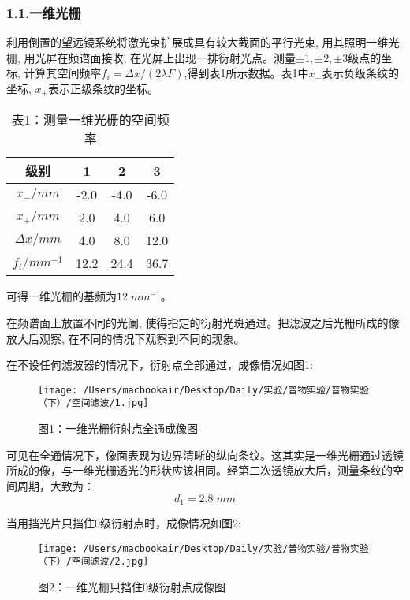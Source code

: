 \documentclass[23pt,a4paper,two column]{article}
\begin{document}
\subsubsection*{1.1.一维光栅}
利用倒置的望远镜系统将激光束扩展成具有较大截面的平行光束, 用其照明一维光栅, 用光屏在频谱面接收, 在光屏上出现一排衍射光点。测量$\pm1,\pm2,\pm3$级点的坐标, 计算其空间频率$f_i=\Delta x/(2\lambda F)$,得到表1所示数据。表1中$x_-$表示负级条纹的坐标, $x_+$表示正级条纹的坐标。
\begin{table}[H]
\centering
\begin{tabular}{c|c|c|c}
	\hline
	\hline
	级别 &1&2&3\\
	\hline
	$x_-/mm$&-2.0&-4.0&-6.0\\
	
	$x_+/mm$&2.0&4.0&6.0\\
	
	$\Delta x/mm$&4.0&8.0&12.0\\
	
	$f_i/mm^{-1}$&12.2&24.4&36.7\\
	\hline
	\hline
\end{tabular}
\caption*{表1：测量一维光栅的空间频率}
\end{table}

可得一维光栅的基频为$12\;mm^{-1}$。

在频谱面上放置不同的光阑, 使得指定的衍射光斑通过。把滤波之后光栅所成的像放大后观察, 在不同的情况下观察到不同的现象。

在不设任何滤波器的情况下，衍射点全部通过，成像情况如图1:
\begin{figure}[H]
\centering
\texttt{[image: /Users/macbookair/Desktop/Daily/实验/普物实验/普物实验（下）/空间滤波/1.jpg]}
\caption*{图1：一维光栅衍射点全通成像图}
\end{figure}

可见在全通情况下，像面表现为边界清晰的纵向条纹。这其实是一维光栅通过透镜所成的像，与一维光栅透光的形状应该相同。经第二次透镜放大后，测量条纹的空间周期，大致为：
\begin{equation*}
d_1=2.8\;mm
\end{equation*}

\newpage

当用挡光片只挡住$0$级衍射点时，成像情况如图2:
\begin{figure}[H]
\centering
\texttt{[image: /Users/macbookair/Desktop/Daily/实验/普物实验/普物实验（下）/空间滤波/2.jpg]}
\caption*{图2：一维光栅只挡住0级衍射点成像图}
\end{figure}
\end{document}
